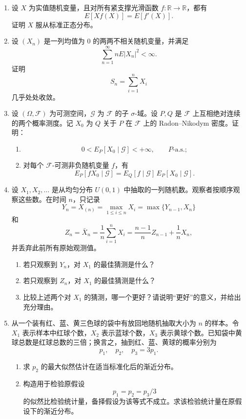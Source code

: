 \documentclass[UTF8,12pt]{ctexart}
\begin{document}
\begin{enumerate}[label=\textbf{\arabic*.},leftmargin=2.2em]
\item 设 \(X\) 为实值随机变量，且对所有紧支撑光滑函数 \(f:\mathbb R\to\mathbb R\)，都有
\[
E[Xf(X)]=E[f'(X)].
\]
证明 \(X\) 服从标准正态分布。

\item 设 \((X_n)\) 是一列均值为 \(0\) 的两两不相关随机变量，并满足
\[
\sum_{n=1}^{\infty} nE|X_n|^2<\infty.
\]
证明
\[
S_n=\sum_{i=1}^nX_i
\]
几乎处处收敛。

\item 设 \((\Omega,\mathcal F)\) 为可测空间，\(\mathcal G\) 为 \(\mathcal F\) 的子 \(\sigma\)-域。设 \(P,Q\) 是 \(\mathcal F\) 上互相绝对连续的两个概率测度。记 \(X_0\) 为 \(Q\) 关于 \(P\) 在 \(\mathcal F\) 上的 Radon--Nikodym 密度。证明：
\begin{enumerate}[label=\textbf{(\alph*)},leftmargin=2.4em]
\item
\[
0<E_P[X_0\mid\mathcal G]<+\infty,\qquad P\text{-a.s.};
\]
\item 对每个 \(\mathcal F\)-可测非负随机变量 \(f\)，有
\[
E_P[fX_0\mid\mathcal G]
=E_Q[f\mid\mathcal G]\,E_P[X_0\mid\mathcal G].
\]
\end{enumerate}

\item 设 \(X_1,X_2,\ldots\) 是从均匀分布 \(U(0,1)\) 中抽取的一列随机数。观察者按顺序观察这些数。在时间 \(n\)，只记录
\[
Y_n=X_{(n)}=\max_{1\le i\le n}X_i=\max\{Y_{n-1},X_n\}
\]
和
\[
Z_n=\bar X_n=\frac1n\sum_{i=1}^nX_i=\frac{n-1}{n}Z_{n-1}+\frac1nX_n,
\]
并丢弃此前所有原始观测值。
\begin{enumerate}[label=\textbf{(\alph*)},leftmargin=2.4em]
\item 若只观察到 \(Y_n\)，对 \(X_1\) 的最佳猜测是什么？
\item 若只观察到 \(Z_n\)，对 \(X_1\) 的最佳猜测是什么？
\item 比较上述两个对 \(X_1\) 的猜测，哪一个更好？请说明“更好”的意义，并给出充分理由。
\end{enumerate}

\item 从一个装有红、蓝、黄三色球的袋中有放回地随机抽取大小为 \(n\) 的样本。令 \(X_1\) 表示样本中红球个数，\(X_2\) 表示蓝球个数，\(X_3\) 表示黄球个数。已知袋中黄球总数是红球总数的三倍；换言之，抽到红、蓝、黄球的概率分别为
\[
p_1,\quad p_2,\quad p_3=3p_1.
\]
\begin{enumerate}[label=\textbf{\arabic*.},leftmargin=2.4em]
\item 求 \(p_2\) 的最大似然估计在适当标准化后的渐近分布。
\item 构造用于检验原假设
\[
p_1=p_2=p_3/3
\]
的似然比检验统计量，备择假设为该等式不成立。求该检验统计量在原假设下的渐近分布。
\end{enumerate}
\end{enumerate}
\end{document}
